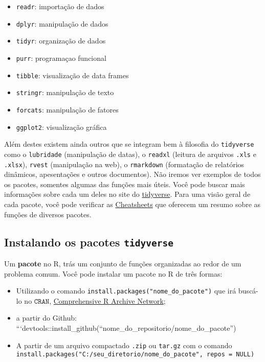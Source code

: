 \documentclass[
]{book}
\providecommand{\tightlist}{%
  \setlength{\itemsep}{0pt}\setlength{\parskip}{0pt}}
\begin{document}
\begin{itemize}
\tightlist
\item
  \texttt{readr}: importação de dados
\item
  \texttt{dplyr}: manipulação de dados
\item
  \texttt{tidyr}: organização de dados
\item
  \texttt{purr}: programaçao funcional
\item
  \texttt{tibble}: visualização de data frames
\item
  \texttt{stringr}: manipulação de texto
\item
  \texttt{forcats}: manipulação de fatores
\item
  \texttt{ggplot2}: visualização gráfica
\end{itemize}

Além destes existem ainda outros que se integram bem à filosofia do \texttt{tidyverse} como o \texttt{lubridade} (manipulação de datas), o \texttt{readxl} (leitura de arquivos \texttt{.xls} e \texttt{.xlsx}), \texttt{rvest} (manipulação na web), o \texttt{rmarkdown} (formatação de relatórios dinâmicos, apesentações e outros documentos). Não iremos ver exemplos de todos os pacotes, somentes algumas das funções mais úteis. Você pode buscar mais informações sobre cada um deles no site do \href{https://www.tidyverse.org/packages/}{tidyverse}. Para uma visão geral de cada pacote, você pode verificar as \href{https://rstudio.com/resources/cheatsheets/}{Cheatsheets} que oferecem um resumo sobre as funções de diversos pacotes.

\hypertarget{instalando-os-pacotes-tidyverse}{%
\subsection{\texorpdfstring{Instalando os pacotes \texttt{tidyverse}}{Instalando os pacotes tidyverse}}\label{instalando-os-pacotes-tidyverse}}

Um \textbf{pacote} no R, trás um conjunto de funções organizadas ao redor de um problema comum. Você pode instalar um pacote no R de três formas:

\begin{itemize}
\tightlist
\item
  Utilizando o comando \texttt{install.packages("nome\_do\_pacote")} que irá buscá-lo no \(\texttt{CRAN}\), \href{https://cran.r-project.org/}{Comprehensive R Archive Network};
\item
  a partir do Github: ```devtools::install\_github(``nome\_do\_repositorio/nome\_do\_pacote'')
\item
  A partir de um arquivo compactado \texttt{.zip} ou \texttt{tar.gz} com o comando \texttt{install.packages("C:/seu\_diretorio/nome\_do\_pacote",\ repos\ =\ NULL)}
\end{itemize}
\end{document}

